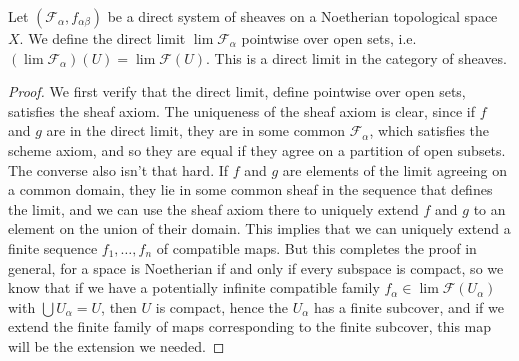 \begin{theorem}
    Let $(\mathcal{F}_\alpha, f_{\alpha \beta})$ be a direct system of sheaves on a Noetherian topological space $X$. We define the direct limit $\lim \mathcal{F}_\alpha$ pointwise over open sets, i.e. $( \lim \mathcal{F}_\alpha)(U) = \lim \mathcal{F}(U)$. This is a direct limit in the category of sheaves.
\end{theorem}
\begin{proof}
    We first verify that the direct limit, define pointwise over open sets, satisfies the sheaf axiom. The uniqueness of the sheaf axiom is clear, since if $f$ and $g$ are in the direct limit, they are in some common $\mathcal{F}_\alpha$, which satisfies the scheme axiom, and so they are equal if they agree on a partition of open subsets. The converse also isn't that hard. If $f$ and $g$ are elements of the limit agreeing on a common domain, they lie in some common sheaf in the sequence that defines the limit, and we can use the sheaf axiom there to uniquely extend $f$ and $g$ to an element on the union of their domain. This implies that we can uniquely extend a finite sequence $f_1, \dots, f_n$ of compatible maps. But this completes the proof in general, for a space is Noetherian if and only if every subspace is compact, so we know that if we have a potentially infinite compatible family $f_\alpha \in \lim \mathcal{F}(U_\alpha)$ with $\bigcup U_\alpha = U$, then $U$ is compact, hence the $U_\alpha$ has a finite subcover, and if we extend the finite family of maps corresponding to the finite subcover, this map will be the extension we needed.

\end{proof}
